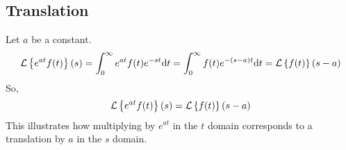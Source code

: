 \subsection{Translation}
\noindent
Let $a$ be a constant.
\begin{equation*}
	\mathcal{L}\left\{ e^{at}f(t) \right\}\left(s\right) = \int_{0}^{\infty}{e^{at}f(t)e^{-st} \mathrm{d}t} = \int_{0}^{\infty}{f(t)e^{-(s-a)t} \mathrm{d}t} = \mathcal{L}\left\{f(t)\right\}\left(s-a\right)
\end{equation*}
So,
\begin{equation*}
	\mathcal{L}\left\{ e^{at}f(t) \right\}\left(s\right) = \mathcal{L}\left\{f(t)\right\}\left(s-a\right)
\end{equation*}
This illustrates how multiplying by $e^{at}$ in the $t$ domain corresponds to a translation by $a$ in the $s$ domain.